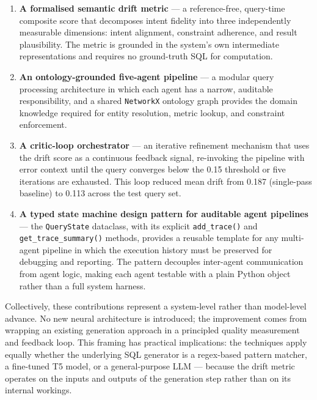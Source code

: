 \documentclass[12pt,a4paper]{report}
\begin{document}
\begin{enumerate}[leftmargin=2em,label=\arabic*.]
  \item \textbf{A formalised semantic drift metric} — a reference-free, query-time composite score that decomposes intent fidelity into three independently measurable dimensions: intent alignment, constraint adherence, and result plausibility. The metric is grounded in the system's own intermediate representations and requires no ground-truth \ac{SQL} for computation.
  \item \textbf{An ontology-grounded five-agent pipeline} — a modular query processing architecture in which each agent has a narrow, auditable responsibility, and a shared \texttt{NetworkX} ontology graph provides the domain knowledge required for entity resolution, metric lookup, and constraint enforcement.
  \item \textbf{A critic-loop orchestrator} — an iterative refinement mechanism that uses the drift score as a continuous feedback signal, re-invoking the pipeline with error context until the query converges below the 0.15 threshold or five iterations are exhausted. This loop reduced mean drift from 0.187 (single-pass baseline) to 0.113 across the test query set.
  \item \textbf{A typed state machine design pattern for auditable agent pipelines} — the \texttt{QueryState} dataclass, with its explicit \texttt{add\_trace()} and \texttt{get\_trace\_summary()} methods, provides a reusable template for any multi-agent pipeline in which the execution history must be preserved for debugging and reporting. The pattern decouples inter-agent communication from agent logic, making each agent testable with a plain Python object rather than a full system harness.
\end{enumerate}

Collectively, these contributions represent a system-level rather than model-level advance. No new neural architecture is introduced; the improvement comes from wrapping an existing generation approach in a principled quality measurement and feedback loop. This framing has practical implications: the techniques apply equally whether the underlying SQL generator is a regex-based pattern matcher, a fine-tuned T5 model, or a general-purpose LLM — because the drift metric operates on the inputs and outputs of the generation step rather than on its internal workings.
\end{document}
